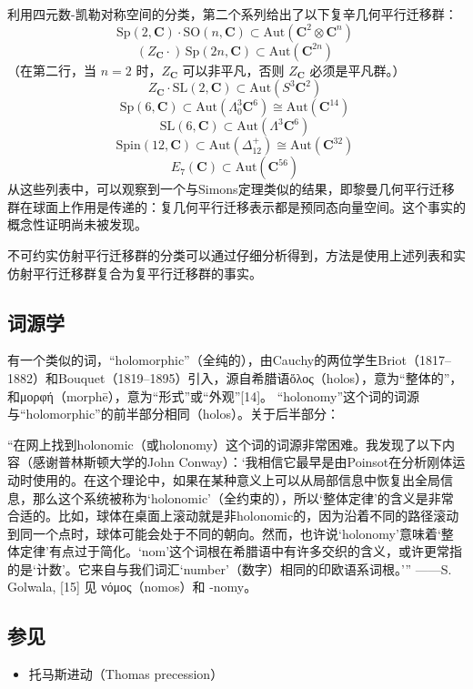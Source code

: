 利用四元数-凯勒对称空间的分类，第二个系列给出了以下复辛几何平行迁移群：
\[
\mathrm{Sp}(2, \mathbf{C}) \cdot \mathrm{SO}(n, \mathbf{C}) \subset \mathrm{Aut}\left(\mathbf{C}^2 \otimes \mathbf{C}^n\right)~
\]
\[
(Z_{\mathbf{C}} \cdot)\, \mathrm{Sp}(2n, \mathbf{C}) \subset \mathrm{Aut}\left(\mathbf{C}^{2n}\right)~
\]
（在第二行，当 \(n = 2\) 时，\(Z_{\mathbf{C}}\) 可以非平凡，否则 \(Z_{\mathbf{C}}\) 必须是平凡群。）
\[
Z_{\mathbf{C}} \cdot \mathrm{SL}(2, \mathbf{C}) \subset \mathrm{Aut}\left(S^3 \mathbf{C}^2\right)~
\]
\[
\mathrm{Sp}(6, \mathbf{C}) \subset \mathrm{Aut}\left(\Lambda_0^3 \mathbf{C}^6\right) \cong \mathrm{Aut}\left(\mathbf{C}^{14}\right)~
\]
\[
\mathrm{SL}(6, \mathbf{C}) \subset \mathrm{Aut}\left(\Lambda^3 \mathbf{C}^6\right)~
\]
\[
\mathrm{Spin}(12, \mathbf{C}) \subset \mathrm{Aut}\left(\Delta_{12}^+\right) \cong \mathrm{Aut}\left(\mathbf{C}^{32}\right)~
\]
\[
E_7(\mathbf{C}) \subset \mathrm{Aut}\left(\mathbf{C}^{56}\right)~
\]
从这些列表中，可以观察到一个与Simons定理类似的结果，即黎曼几何平行迁移群在球面上作用是传递的：复几何平行迁移表示都是预同态向量空间。这个事实的概念性证明尚未被发现。

不可约实仿射平行迁移群的分类可以通过仔细分析得到，方法是使用上述列表和实仿射平行迁移群复合为复平行迁移群的事实。
\subsection{词源学}  
有一个类似的词，“holomorphic”（全纯的），由Cauchy的两位学生Briot（1817–1882）和Bouquet（1819–1895）引入，源自希腊语ὅλος（holos），意为“整体的”，和μορφή（morphē），意为“形式”或“外观”[14]。 “holonomy”这个词的词源与“holomorphic”的前半部分相同（holos）。关于后半部分：

“在网上找到holonomic（或holonomy）这个词的词源非常困难。我发现了以下内容（感谢普林斯顿大学的John Conway）：‘我相信它最早是由Poinsot在分析刚体运动时使用的。在这个理论中，如果在某种意义上可以从局部信息中恢复出全局信息，那么这个系统被称为‘holonomic’（全约束的），所以‘整体定律’的含义是非常合适的。比如，球体在桌面上滚动就是非holonomic的，因为沿着不同的路径滚动到同一个点时，球体可能会处于不同的朝向。然而，也许说‘holonomy’意味着‘整体定律’有点过于简化。‘nom’这个词根在希腊语中有许多交织的含义，或许更常指的是‘计数’。它来自与我们词汇‘number’（数字）相同的印欧语系词根。’”  
——S. Golwala, [15]  
见 νόμος（nomos）和 -nomy。
\subsection{参见}  
\begin{itemize}
\item 托马斯进动（Thomas precession）
\end{itemize}

